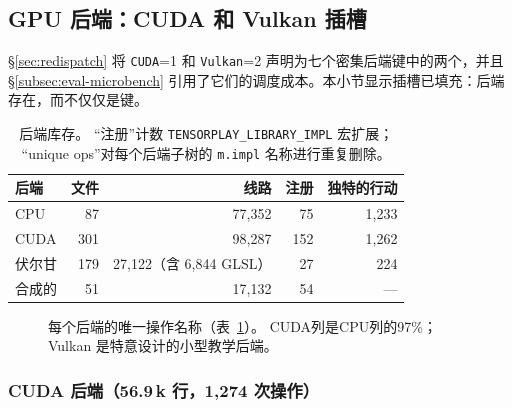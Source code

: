 \subsection{GPU 后端：CUDA 和 Vulkan 插槽}
\label{subsec:eval-backends}

\S\ref{sec:redispatch} 将 \texttt{CUDA}=1 和 \texttt{Vulkan}=2 声明为七个密集后端键中的两个，并且 \S\ref{subsec:eval-microbench} 引用了它们的调度成本。本小节显示插槽已填充：后端存在，而不仅仅是键。

\begin{table}[H]
\centering
\caption{后端库存。 “注册”计数 \texttt{TENSORPLAY\_LIBRARY\_IMPL} 宏扩展； “unique ops”对每个后端子树的 \texttt{m.impl} 名称进行重复删除。}
\label{tab:backends}
\small
\begin{tabular}{lrrrr}
\toprule
后端 & 文件 & 线路 & 注册 & 独特的行动 \\
\midrule
CPU & 87 & 77{,}352 & 75 & 1{,}233 \\
CUDA & 301 & 98{,}287 & 152 & 1{,}262 \\
伏尔甘 & 179 & 27{,}122（含 6{,}844 GLSL） & 27 & 224 \\
合成的 & 51 & 17{,}132 & 54 & --- \\
\bottomrule
\end{tabular}
\end{table}

\begin{figure}[H]
\centering
{}
\caption{每个后端的唯一操作名称（表~\ref{tab:backends}）。 CUDA列是CPU列的97\%； Vulkan 是特意设计的小型教学后端。}
\label{fig:backendops}
\end{figure}

\subsubsection{CUDA 后端（56.9\,k 行，1{,}274 次操作）}

